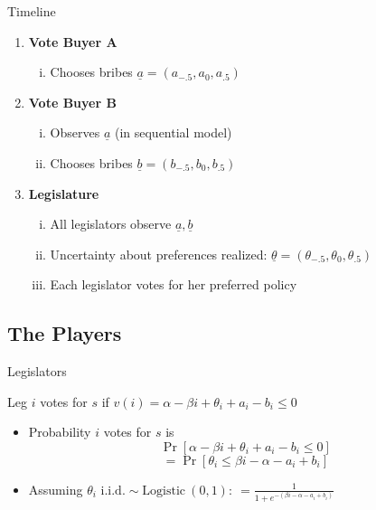 \documentclass[handout]{beamer}
\newcommand{\ta}{\theta}
\newcommand{\un}{\underline}
\begin{document}
\begin{frame}{Timeline}
\pause
\begin{enumerate}[<+->]
	\item {\bfseries Vote Buyer A}
		\begin{enumerate}[i.]
			\item Chooses bribes $\un{a} = \left(a_{-.5},a_0,a_{.5}\right)$
		\end{enumerate}
	\item \textbf{Vote Buyer B}
		\begin{enumerate}[i.]
			\item Observes $\un{a}$ (in sequential model)
			\item Chooses bribes $\un{b} = \left(b_{-.5},b_0,b_{.5}\right)$
		\end{enumerate}
	\item \textbf{Legislature}
		\begin{enumerate}[i.]
			\item All legislators observe $\un{a},\un{b}$
			\item Uncertainty about preferences realized: $\un{\ta} = \left(\ta_{-.5},\ta_0,\ta_{.5}\right)$
			\item Each legislator votes for her preferred policy 
		\end{enumerate}
\end{enumerate}
\end{frame}


\subsection{The Players}

\begin{frame}{Legislators}

\pause
Leg $i$ votes for $s$ if $v(i) = \alpha -\beta i + \ta_i + a_i - b_i \leq 0$
\pause
	\begin{itemize}[<+->]
		\item Probability $i$ votes for $s$ is
		\pause
			\[ 
				\Pr\left[\alpha -\beta i + \ta_i + a_i - b_i \leq 0 \right]
			\]
		\pause
			\[
				= \Pr\left[\ta_i \leq \beta i - \alpha - a_i + b_i \right]
			\]
		\pause
		\item Assuming $\ta_i \text{ i.i.d.} \sim \text{Logistic} \ (0,1): \ = \frac{1}{1+e^{-\left(\beta i - \alpha - a_i + b_i \right)}}$ 
	\end{itemize}
\end{frame}
\end{document}
